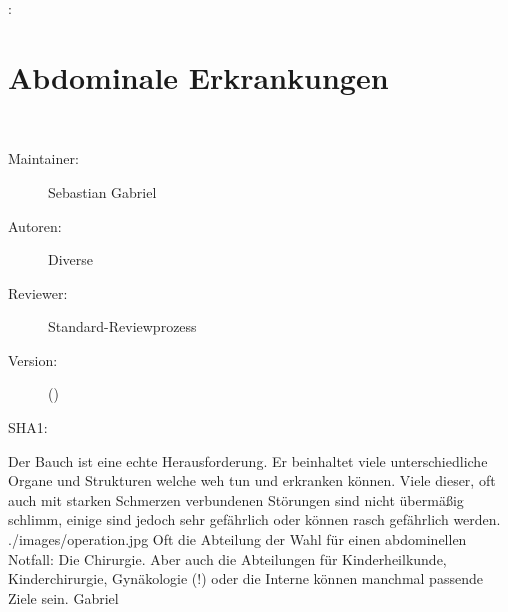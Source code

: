 {
: 
}{}
% 














\chapter
[\CO{[ABD]} Abdominale Erkrankungen]
{\CC{[ABD]} Abdominale Erkrankungen}
\ChapterIntro
{%
~~~
}
{%
\begin{description}
  \item[Maintainer:] Sebastian Gabriel
  \item[Autoren:] Diverse
  \item[Reviewer:] Standard-Reviewprozess
  \item[Version:] {\DocVersion} ({\DocVersionInfo})
  \item[SHA1:] {\DocGitCommit}
\end{description}

{\TxTeilkapitelAASS}
}


{%
Der Bauch ist eine echte Herausforderung. Er beinhaltet
viele unterschiedliche Organe und Strukturen welche weh tun
und erkranken können. Viele dieser, oft auch mit starken
Schmerzen verbundenen Störungen sind nicht übermäßig
schlimm, einige sind jedoch sehr gefährlich oder können
rasch gefährlich werden.
}
{}
{./images/operation.jpg}
{\AuthNotesPicLegalOk{}{}Oft die
    Abteilung der Wahl für einen abdominellen Notfall: Die
    Chirurgie. Aber auch die Abteilungen für
    Kinderheilkunde, Kinderchirurgie, Gynäkologie (!) oder
    die Interne können manchmal passende Ziele sein.
    }{Gabriel}


